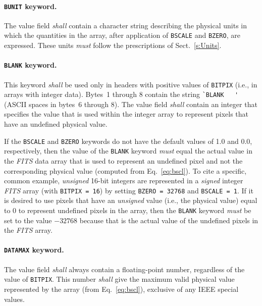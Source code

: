 \documentclass[onecolumn]{aa}
\begin{document}
   \paragraph{{\tt BUNIT} keyword.}
 The value field {\em shall} contain a character 
 string
 describing the physical units in which the quantities 
 in the array, after application of {\tt BSCALE} 
 and {\tt BZERO},
 are expressed.  These units {\em must} follow the
 prescriptions of Sect.\ \ref{s:Units}.

   \paragraph{{\tt BLANK} keyword.}
 This keyword {\em shall} be used only in headers with
 positive values of {\tt BITPIX}  (i.e., in arrays
 with integer data). Bytes~1 through 8 contain the string 
 \verb*+`BLANK   '+ (ASCII spaces in bytes~6 through 8).  The value 
 field {\em shall} contain an integer that specifies the value that 
 is used within the integer array to represent pixels that have an
 undefined physical value. 

 If the {\tt BSCALE} and {\tt BZERO} keywords do not have the
 default values of 1.0 and 0.0, respectively, then the value of the
 {\tt BLANK} keyword {\em must} equal the actual value in the {\em
 FITS\/} data array  that is used to represent an undefined pixel
 and not the corresponding physical value (computed from Eq.~\ref{eq:bscl}).
 To cite a specific, common example,  {\em unsigned} 16-bit integers
 are represented in a {\em signed}
 integer {\em FITS\/} array (with {\tt BITPIX~=~16}) by setting 
 {\tt BZERO = 32768} and {\tt BSCALE = 1}.  If it is desired  to
 use pixels that have an {\em unsigned} value (i.e., the physical
 value) equal to 0 to represent  undefined pixels in the array,
 then the {\tt BLANK}  keyword {\em must} be set to the value
 $-32768$   because that is the actual value of the undefined pixels in the
 {\em FITS\/}  array. 

   \paragraph{{\tt DATAMAX} keyword.}
 The value field {\em shall} always contain a floating-point
 number, regardless of the value of {\tt BITPIX}. This
 number {\em shall} give the maximum valid physical value 
 represented by the array (from Eq.~\ref{eq:bscl}), exclusive of 
 any IEEE special values.
  
\end{document}
